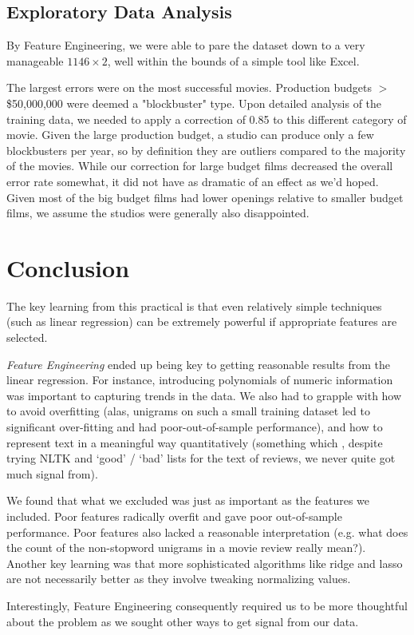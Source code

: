 \documentclass[11pt, oneside]{article}   	%
\begin{document}
\subsection*{Exploratory Data Analysis}

By Feature Engineering, we were able to pare the dataset down to a very manageable $1146 \times 2$, well within the bounds of a simple tool like Excel.

The largest errors were on the most successful movies. Production budgets $>$ {\$50,000,000} were deemed a "blockbuster" type. Upon detailed analysis of the training data, we needed to apply a correction of 0.85 to this different category of movie. Given the large production budget, a studio can produce only a few blockbusters per year, so by definition they are outliers compared to the majority of the movies. While our correction for large budget films decreased the overall error rate somewhat, it did not have as dramatic of an effect as we'd hoped. Given most of the big budget films had lower openings relative to smaller budget films, we assume the studios were generally also disappointed.

\section*{Conclusion}
The key learning from this practical is that even relatively simple techniques (such as linear regression) can be extremely powerful if appropriate features are selected. 

\emph{Feature Engineering} ended up being key to getting reasonable results from the linear regression. For instance, introducing polynomials of numeric information was important to capturing trends in the data. We also had to grapple with how to avoid overfitting (alas, unigrams on such a small training dataset led to significant over-fitting and had poor-out-of-sample performance), and how to represent text in a meaningful way quantitatively (something which , despite trying NLTK and `good' / `bad' lists for the text of reviews, we never quite got much signal from).

We found that what we excluded was just as important as the features we included. Poor features radically overfit and gave poor out-of-sample performance. Poor features also lacked a reasonable interpretation (e.g. what does the count of the non-stopword unigrams in a movie review really mean?). Another key learning was that more sophisticated algorithms like ridge and lasso are not necessarily better as they involve tweaking normalizing values.

Interestingly, Feature Engineering consequently required us to be more thoughtful about the problem as we sought other ways to get signal from our data. 
\end{document}
